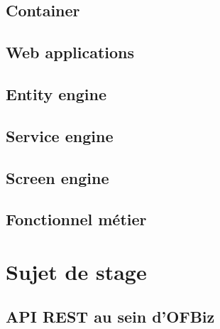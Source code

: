 \subsection{Container}
\subsection{Web applications}
\subsection{Entity engine}
\subsection{Service engine}
\subsection{Screen engine}
\subsection{Fonctionnel métier}


\section{Sujet de stage }



\subsection{API REST au sein d'OFBiz}

